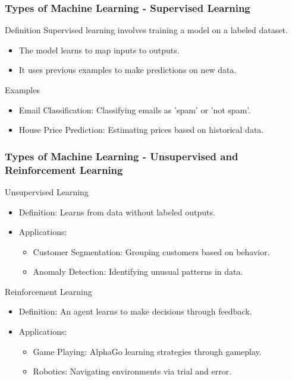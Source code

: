 \documentclass[aspectratio=169]{beamer}
\begin{document}
\begin{frame}[fragile]
    \frametitle{Types of Machine Learning - Supervised Learning}
    \begin{block}{Definition}
        Supervised learning involves training a model on a labeled dataset.
    \end{block}
    
    \begin{itemize}
        \item The model learns to map inputs to outputs.
        \item It uses previous examples to make predictions on new data.
    \end{itemize}

    \begin{block}{Examples}
        \begin{itemize}
            \item Email Classification: Classifying emails as 'spam' or 'not spam'.
            \item House Price Prediction: Estimating prices based on historical data.
        \end{itemize}
    \end{block}
\end{frame}

\begin{frame}[fragile]
    \frametitle{Types of Machine Learning - Unsupervised and Reinforcement Learning}
    \begin{block}{Unsupervised Learning}
        \begin{itemize}
            \item Definition: Learns from data without labeled outputs.
            \item Applications:
            \begin{itemize}
                \item Customer Segmentation: Grouping customers based on behavior.
                \item Anomaly Detection: Identifying unusual patterns in data.
            \end{itemize}
        \end{itemize}
    \end{block}

    \begin{block}{Reinforcement Learning}
        \begin{itemize}
            \item Definition: An agent learns to make decisions through feedback.
            \item Applications:
            \begin{itemize}
                \item Game Playing: AlphaGo learning strategies through gameplay.
                \item Robotics: Navigating environments via trial and error.
            \end{itemize}
        \end{itemize}
    \end{block}
\end{frame}
\end{document}
